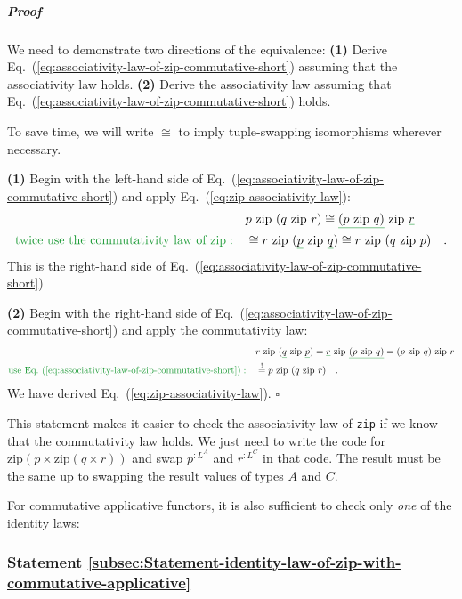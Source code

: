 \subparagraph{Proof}

We need to demonstrate two directions of the equivalence: \textbf{(1)}
Derive Eq.~(\ref{eq:associativity-law-of-zip-commutative-short})
assuming that the associativity law holds. \textbf{(2)} Derive the
associativity law assuming that Eq.~(\ref{eq:associativity-law-of-zip-commutative-short})
holds.

To save time, we will write $\cong$ to imply tuple-swapping isomorphisms
wherever necessary.

\textbf{(1)} Begin with the left-hand side of Eq.~(\ref{eq:associativity-law-of-zip-commutative-short})
and apply Eq.~(\ref{eq:zip-associativity-law}):
\begin{align*}
 & p\,\,\text{zip}\,\,(q\,\,\text{zip}\,\,r)\cong\gunderline{(p\,\,\text{zip}\,\,q)}\,\,\text{zip}\,\,\gunderline r\\
{\color{greenunder}\text{twice use the commutativity law of }\text{zip}:}\quad & \cong r\,\,\text{zip}\,\,(\gunderline p\,\,\text{zip}\,\,\gunderline q)\cong r\,\,\text{zip}\,\,(q\,\,\text{zip}\,\,p)\quad.
\end{align*}
This is the right-hand side of Eq.~(\ref{eq:associativity-law-of-zip-commutative-short})

\textbf{(2)} Begin with the right-hand side of Eq.~(\ref{eq:associativity-law-of-zip-commutative-short})
and apply the commutativity law:
\begin{align*}
 & r\,\,\text{zip}\,\,(\gunderline q\,\,\text{zip}\,\,\gunderline p)=\gunderline r\,\,\text{zip}\,\,\gunderline{(p\,\,\text{zip}\,\,q)}=(p\,\,\text{zip}\,\,q)\,\,\text{zip}\,\,r\\
{\color{greenunder}\text{use Eq.~(\ref{eq:associativity-law-of-zip-commutative-short})}:}\quad & \overset{!}{=}p\,\,\text{zip}\,\,(q\,\,\text{zip}\,\,r)\quad.
\end{align*}
We have derived Eq.~(\ref{eq:zip-associativity-law}). $\square$

This statement makes it easier to check the associativity law of \lstinline!zip!
if we know that the commutativity law holds. We just need to write
the code for $\text{zip}\left(p\times\text{zip}\left(q\times r\right)\right)$
and swap $p^{:L^{A}}$ and $r^{:L^{C}}$ in that code. The result
must be the same up to swapping the result values of types $A$ and
$C$.

For commutative applicative functors, it is also sufficient to check
only \emph{one} of the identity laws:

\subsubsection{Statement \label{subsec:Statement-identity-law-of-zip-with-commutative-applicative}\ref{subsec:Statement-identity-law-of-zip-with-commutative-applicative}}

